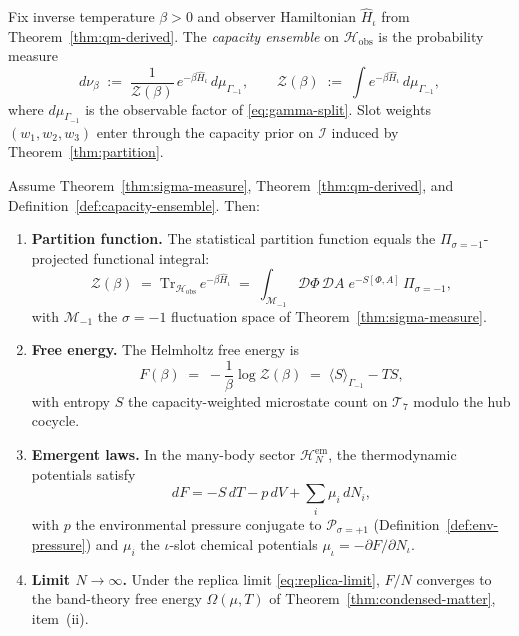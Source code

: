 \begin{definition}\label{def:capacity-ensemble}
Fix inverse temperature $\beta>0$ and observer Hamiltonian $\hat H_\iota$ from
Theorem~\ref{thm:qm-derived}. The \emph{capacity ensemble} on
$\mathcal{H}_{\mathrm{obs}}$ is the probability measure
\begin{equation}\label{eq:capacity-ensemble}
  d\nu_\beta
  \;:=\;
  \frac{1}{\mathcal{Z}(\beta)}\,
  e^{-\beta\hat H_\iota}\,
  d\mu_{\Gamma_{-1}},
  \qquad
  \mathcal{Z}(\beta)
  \;:=\;
  \int e^{-\beta\hat H_\iota}\,d\mu_{\Gamma_{-1}},
\end{equation}
where $d\mu_{\Gamma_{-1}}$ is the observable factor of
\eqref{eq:gamma-split}. Slot weights $(w_1,w_2,w_3)$ enter through the
capacity prior on $\mathcal{I}$ induced by Theorem~\ref{thm:partition}.
\end{definition}

\begin{theorem}
\label{thm:thermodynamics}
Assume Theorem~\ref{thm:sigma-measure}, Theorem~\ref{thm:qm-derived}, and
Definition~\ref{def:capacity-ensemble}. Then:
\begin{enumerate}[label=(\roman*),leftmargin=*]
  \item \textbf{Partition function.} The statistical partition function
    equals the $\Pi_{\sigma=-1}$-projected functional integral:
    \begin{equation}\label{eq:Z-sigma}
      \mathcal{Z}(\beta)
      \;=\;
      \mathrm{Tr}_{\mathcal{H}_{\mathrm{obs}}}\,e^{-\beta\hat H_\iota}
      \;=\;
      \int_{\mathcal{M}_{-1}}
      \mathcal{D}\Phi\,\mathcal{D}A\;
      e^{-S[\Phi,A]}\,
      \Pi_{\sigma=-1},
    \end{equation}
    with $\mathcal{M}_{-1}$ the $\sigma=-1$ fluctuation space of
    Theorem~\ref{thm:sigma-measure}.
  \item \textbf{Free energy.} The Helmholtz free energy is
    \begin{equation}\label{eq:helmholtz}
      F(\beta)
      \;=\;
      -\frac{1}{\beta}\log\mathcal{Z}(\beta)
      \;=\;
      \langle S\rangle_{\Gamma_{-1}} - TS,
    \end{equation}
    with entropy $S$ the capacity-weighted microstate count on
    $\mathcal{T}_7$ modulo the hub cocycle.
  \item \textbf{Emergent laws.} In the many-body sector
    $\mathcal{H}_N^{\mathrm{em}}$, the thermodynamic potentials satisfy
    \begin{equation}\label{eq:thermo-laws}
      dF = -S\,dT - p\,dV + \sum_i\mu_i\,dN_i,
    \end{equation}
    with $p$ the environmental pressure conjugate to
    $\mathcal{P}_{\sigma=+1}$ (Definition~\ref{def:env-pressure}) and
    $\mu_i$ the $\iota$-slot chemical potentials
    $\mu_\iota=-\partial F/\partial N_\iota$.
  \item \textbf{Limit $N\to\infty$.} Under the replica limit
    \eqref{eq:replica-limit}, $F/N$ converges to the band-theory free energy
    $\Omega(\mu,T)$ of Theorem~\ref{thm:condensed-matter}, item~(ii).
\end{enumerate}
\end{theorem}

